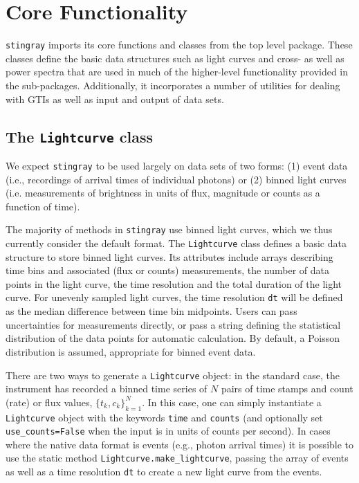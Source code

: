 \documentclass[twocolumn]{aastex62}
\newcommand{\stingray}{\texttt{stingray}\xspace}
\newcommand{\lightcurve}{\texttt{Lightcurve}\xspace}
\begin{document}

\section{Core Functionality}
\label{sec:core}

\stingray imports its core functions and classes from the top level package. 
These classes define the basic data structures such as light curves and cross- as well as power spectra that are used in much of the higher-level functionality provided in the sub-packages. 
Additionally, it incorporates a number of utilities for dealing with GTIs as well as input and output of data sets. 

\subsection{The \texttt{Lightcurve} class}
\label{sec:lightcurve}

We expect \stingray to be used largely on data sets of two forms: (1) event data (i.e., recordings of arrival times of individual photons) or (2) binned light curves (i.e. measurements of brightness in units of flux, magnitude or counts as a function of time). 

The majority of methods in \stingray use binned light curves, which we thus currently consider the default format. 
The \lightcurve class defines a basic data structure to store binned light curves. Its attributes include arrays describing time bins and associated (flux or counts) measurements, the number of data points in the light curve, the time resolution and the total duration of the light curve. 
For unevenly sampled light curves, the time resolution \texttt{dt} will be defined as the median difference between time bin midpoints. Users can pass uncertainties for measurements directly, or pass a string defining the statistical distribution of the data points for automatic calculation. 
By default, a Poisson distribution is assumed, appropriate for binned event data. 

There are two ways to generate a \texttt{Lightcurve} object: in the standard case, the instrument has recorded a binned time series of $N$ pairs of time stamps and count (rate) or flux values, $\{t_k, c_k \}_{k=1}^{N}$. 
In this case, one can simply instantiate a \texttt{Lightcurve} object with the keywords \texttt{time} and \texttt{counts} (and optionally set \texttt{use\_counts=False} when the input is in units of counts per second). 
In cases where the native data format is events (e.g., photon arrival times) it is possible to use the static method \texttt{Lightcurve.make\_lightcurve}, passing the array of events as well as a time resolution \texttt{dt} to create a new light curve from the events.
\end{document}
